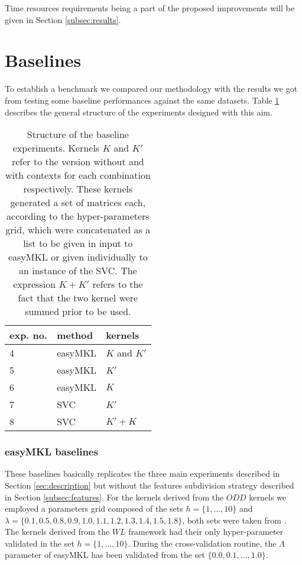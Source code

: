 Time resources requirements being a part of the proposed improvements will be given
in Section \ref{subsec:results}.

\section{Baselines}
To establish a benchmark we compared our methodology with the results we got
from testing some baseline performances against the same datasets.
Table \ref{table:baselines} describes the general structure of the experiments
designed with this aim.

\begin{table}[ht]
    \centering
    \begin{tabular}{|l|l|l|}
        \hline
        exp. no. & method & kernels \\
        \hline
        4 & easyMKL & $K$ and $K'$ \\
        \hline
        5 & easyMKL & $K'$ \\
        \hline
        6 & easyMKL & $K$ \\
        \hline
        7 & SVC & $K'$ \\
        \hline
        8 & SVC & $K'+K$ \\
        \hline
    \end{tabular}
    \caption{Structure of the baseline experiments. Kernels $K$ and $K'$ refer
    to the version without and with contexts for each combination respectively.
    These kernels generated a set of matrices each, according to the hyper-parameters
    grid, which were concatenated as a list to be given in input to easyMKL or
    given individually to an instance of the SVC. The expression $K + K'$ refers
    to the fact that the two kernel were summed prior to be used.}
    \label{table:baselines}
\end{table}

\subsubsection{easyMKL baselines}
These baselines basically replicates the three main experiments described in Section
\ref{sec:description} but without the features subdivision strategy described in
Section \ref{subsec:features}.
For the kernels derived from the $ODD$ kernels we employed a parameters grid composed
of the sets $h=\{1,\dots,10\}$ and $\lambda=\{0.1, 0.5, 0.8, 0.9, 1.0, 1.1, 1.2, 1.3, 1.4, 1.5, 1.8\}$,
both sets were taken from \cite{rtesselli}.
The kernels derived from the $WL$ framework had their only hyper-parameter validated
in the set $h=\{1,\dots,10\}$.
During the cross-validation routine, the $\Lambda$ parameter of easyMKL has been
validated from the set $\{0.0, 0.1,\dots,1.0\}$.

